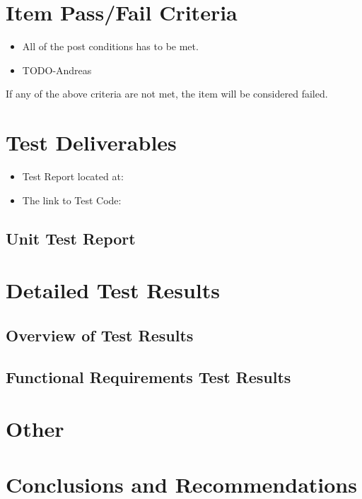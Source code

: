 \documentclass[11pt]{article}
\begin{document}
	\section{Item Pass/Fail Criteria}
	\begin{itemize}
		\item All of the post conditions has to be met.
		\item TODO-Andreas
	\end{itemize}
	If any of the above criteria are not met, the item will be considered failed.

	\section{Test Deliverables}
	\begin{itemize}
		\item Test Report located at: 
		\item The link to Test Code:
	\end{itemize}
	\newpage
	\begin{center}
		\section*{Unit Test Report}
	\end{center}
	
	\section{Detailed Test Results}
	\label{sec:DetailedTestResults}
		
	\subsection{Overview of Test Results}
	
	\subsection{Functional Requirements Test Results}
	
	\newpage	
	
	\section{Other}
	
	\section{Conclusions and Recommendations}
	
\end{document}
